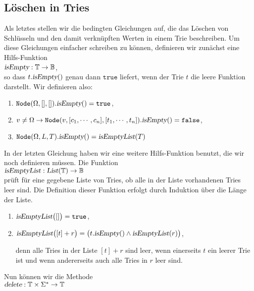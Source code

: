 \subsection{L\"oschen in Tries}
Als letztes stellen wir die bedingten Gleichungen auf, die das L\"oschen von
Schl\"usseln und den damit verkn\"upften Werten in einem Trie beschreiben.
Um diese Gleichungen einfacher schreiben zu k\"onnen, definieren wir zun\"achst eine
Hilfs-Funktion 
\\[0.2cm]
\hspace*{1.3cm} 
$\textsl{isEmpty}: \mathbb{T} \rightarrow \mathbb{B}$, 
\\[0.2cm]
so dass $t.\textsl{isEmpty}()$ genau dann $\mathtt{true}$ liefert, wenn der Trie
$t$ die leere Funktion darstellt.  Wir definieren also: 
\begin{enumerate}
\item $\texttt{Node}(\Omega, [],[]).\textsl{isEmpty}() = \mathtt{true}$,
\item $v \not= \Omega \rightarrow 
       \texttt{Node}(v, [c_1,\cdots,c_n],[t_1,\cdots,t_n]).\textsl{isEmpty}() = \mathtt{false}$,
\item $\texttt{Node}(\Omega, L, T).\textsl{isEmpty}() = \textsl{isEmptyList}(T)$
\end{enumerate}
In der letzten Gleichung haben wir eine weitere Hilfs-Funktion benutzt, die wir noch
definieren m\"ussen.  Die Funktion
\\[0.2cm]
\hspace*{1.3cm}
$\textsl{isEmptyList}: \textsl{List}(\mathbb{T}) \rightarrow \mathbb{B}$
\\[0.2cm]
pr\"uft f\"ur eine gegebene Liste von Tries, ob alle in der Liste vorhandenen Tries leer sind.
Die Definition dieser Funktion erfolgt durch Induktion \"uber die L\"ange der Liste.
\begin{enumerate}
\item $\textsl{isEmptyList}\bigl([]\bigr) = \mathtt{true}$,
\item $\textsl{isEmptyList}\bigl([t] + r\bigr) = \bigl(t.\textsl{isEmpty}() \wedge \textsl{isEmptyList}(r)\bigr)$,

      denn alle Tries in der Liste $[t]+r$ sind leer, wenn einerseits $t$ ein leerer
      Trie ist und wenn andererseits auch alle Tries in $r$ leer sind.
\end{enumerate}
Nun k\"onnen wir die Methode
\\[0.2cm]
\hspace*{1.3cm}
$\textsl{delete}: \mathbb{T} \times \Sigma^* \rightarrow \mathbb{T}$
